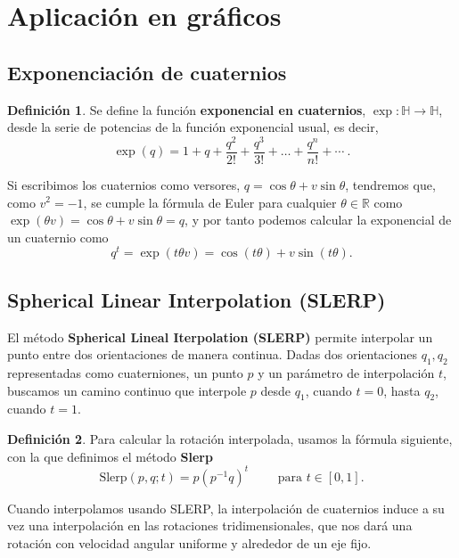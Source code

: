 \documentclass{article}
\theoremstyle{plain}
\theoremstyle{definition}
\newtheorem{definition}{Definición}
\theoremstyle{remark}
\begin{document}
\section{Aplicación en gráficos}

\subsection{Exponenciación de cuaternios}
\begin{definition}
  Se define la función \textbf{exponencial en cuaternios},
  $\exp \colon \mathbb{H} \to \mathbb{H}$, desde la serie de potencias
  de la función exponencial usual, es decir,
  \[\exp(q) =  1 + q + \frac{q^2}{2!} + \frac{q^3}{3!} + \dots + \frac{q^n}{n!} + \cdots\ .
  \]
\end{definition}

Si escribimos los cuaternios como versores,
$q = \cos \theta + v \sin \theta$, tendremos que, como $v^2 = -1$, se
cumple la fórmula de Euler para cualquier $\theta \in \mathbb{R}$ como
$\exp(\theta v) = \cos \theta + v \sin \theta = q$, y por tanto
podemos calcular la exponencial de un cuaternio como
\[q^t = \exp(t \theta v) = \cos (t \theta) + v \sin (t \theta).\]

\subsection{Spherical Linear Interpolation (SLERP)}

El método \textbf{Spherical Lineal Iterpolation (SLERP)} permite
interpolar un punto entre dos orientaciones de manera continua. Dadas
dos orientaciones $q_1,q_2$ representadas como cuaterniones, un punto
$p$ y un parámetro de interpolación $t$, buscamos un camino continuo
que interpole $p$ desde $q_1$, cuando $t=0$, hasta $q_2$, cuando
$t=1$.

\begin{definition}
  Para calcular la rotación interpolada, usamos la fórmula \cite{vince11}
  siguiente, con la que definimos el método \textbf{Slerp}
  \[\mathrm{Slerp}(p,q;t) = p(p^{-1}q)^t \qquad\text{ para } t \in [0,1].\]
\end{definition}

Cuando interpolamos usando SLERP, la interpolación de cuaternios
induce a su vez una interpolación en las rotaciones tridimensionales,
que nos dará una rotación con velocidad angular uniforme y alrededor
de un eje fijo.
\end{document}
